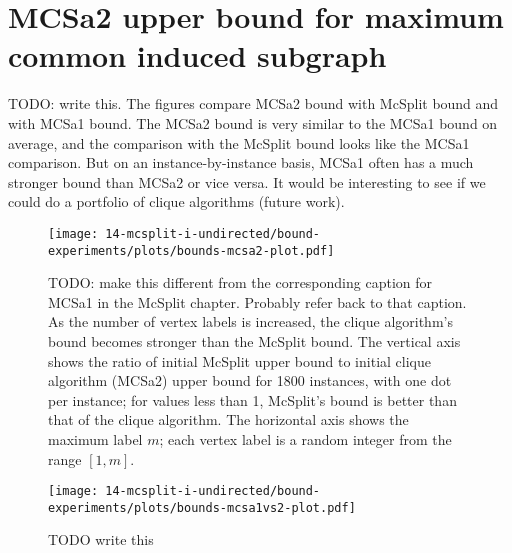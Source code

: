 \chapter{MCSa2 upper bound for maximum common induced subgraph}
\label{a:appendix-mcsa2}

TODO: write this. The figures compare MCSa2 bound with McSplit bound and with MCSa1 bound.
The MCSa2 bound is very similar to the MCSa1 bound on average, and the comparison with the McSplit bound
looks like the MCSa1 comparison.  But on an instance-by-instance basis, MCSa1 often has a much stronger
bound than MCSa2 or vice versa.  It would be interesting to see if we could do a portfolio of clique
algorithms (future work).

\begin{figure}[h!]
    \centering
    \texttt{[image: 14-mcsplit-i-undirected/bound-experiments/plots/bounds-mcsa2-plot.pdf]}
    \caption{TODO: make this different from the corresponding caption for MCSa1 in the McSplit chapter.
        Probably refer back to that caption.
        As the number of vertex labels is increased, the clique algorithm's bound
    	becomes stronger than the McSplit bound.
        The vertical axis shows the ratio of initial McSplit upper bound
	to initial clique algorithm (MCSa2) upper bound for 1800 instances, with one dot per instance;
	for values less than 1, McSplit's bound is better than that of the clique algorithm.
	The horizontal axis shows the maximum label $m$; each vertex label is a random integer 
	from the range $[1,m]$.}
    \label{figure:bound-mcsa2}
\end{figure}

\begin{figure}[h!]
    \centering
    \texttt{[image: 14-mcsplit-i-undirected/bound-experiments/plots/bounds-mcsa1vs2-plot.pdf]}
    \caption{TODO write this}
    \label{figure:bound-mcsa1vs2}
\end{figure}


